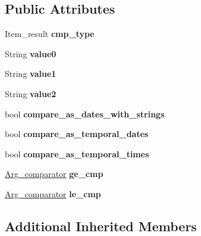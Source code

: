\subsection*{Public Attributes}
\begin{DoxyCompactItemize}
\item 
\mbox{\label{classItem__func__between_a44561c41e612b8cf07dd096153a4161a}} 
Item\+\_\+result {\bfseries cmp\+\_\+type}
\item 
\mbox{\label{classItem__func__between_a7019f4e0f66d55c6876cdb8780993892}} 
String {\bfseries value0}
\item 
\mbox{\label{classItem__func__between_a1e91da4b33c394ec9afa52d7755e3b0a}} 
String {\bfseries value1}
\item 
\mbox{\label{classItem__func__between_a59627a94295c6ec1720a1320b3a87d2c}} 
String {\bfseries value2}
\item 
\mbox{\label{classItem__func__between_a09c92b12f2bee1b10c559b8a1e2d9ad2}} 
bool {\bfseries compare\+\_\+as\+\_\+dates\+\_\+with\+\_\+strings}
\item 
\mbox{\label{classItem__func__between_a5a4edb38d984acca24cca7a4241e3c4e}} 
bool {\bfseries compare\+\_\+as\+\_\+temporal\+\_\+dates}
\item 
\mbox{\label{classItem__func__between_ae0c26ddbb11e21e070c86352fb951258}} 
bool {\bfseries compare\+\_\+as\+\_\+temporal\+\_\+times}
\item 
\mbox{\label{classItem__func__between_a04262e8d526e4422f92f42447d202dd0}} 
\mbox{\hyperlink{classArg__comparator}{Arg\+\_\+comparator}} {\bfseries ge\+\_\+cmp}
\item 
\mbox{\label{classItem__func__between_a6be3f38c1a61308c9031dbd3e60620ef}} 
\mbox{\hyperlink{classArg__comparator}{Arg\+\_\+comparator}} {\bfseries le\+\_\+cmp}
\end{DoxyCompactItemize}
\subsection*{Additional Inherited Members}


